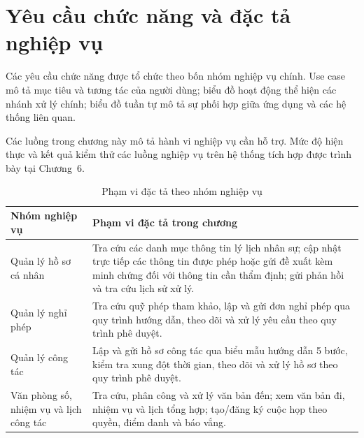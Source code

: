 \section{Yêu cầu chức năng và đặc tả nghiệp vụ}
\label{sec:yeucau_chucnang}
\label{sec:yeucau_chucnang_modules}

Các yêu cầu chức năng được tổ chức theo bốn nhóm nghiệp vụ chính. Use case mô tả mục tiêu và tương tác của người dùng; biểu đồ hoạt động thể hiện các nhánh xử lý chính; biểu đồ tuần tự mô tả sự phối hợp giữa ứng dụng và các hệ thống liên quan.

Các luồng trong chương này mô tả hành vi nghiệp vụ cần hỗ trợ. Mức độ hiện thực và kết quả kiểm thử các luồng nghiệp vụ trên hệ thống tích hợp được trình bày tại Chương~6.

\begin{table}[H]
\centering
\small
\caption{Phạm vi đặc tả theo nhóm nghiệp vụ}
\label{tab:module_owner_scope}
\begin{tabularx}{\textwidth}{|L{4.2cm}|Y|}
\hline
\textbf{Nhóm nghiệp vụ} & \textbf{Phạm vi đặc tả trong chương} \\
\hline
Quản lý hồ sơ cá nhân & Tra cứu các danh mục thông tin lý lịch nhân sự; cập nhật trực tiếp các thông tin được phép hoặc gửi đề xuất kèm minh chứng đối với thông tin cần thẩm định; gửi phản hồi và tra cứu lịch sử xử lý. \\
\hline
Quản lý nghỉ phép & Tra cứu quỹ phép tham khảo, lập và gửi đơn nghỉ phép qua quy trình hướng dẫn, theo dõi và xử lý yêu cầu theo quy trình phê duyệt. \\
\hline
Quản lý công tác & Lập và gửi hồ sơ công tác qua biểu mẫu hướng dẫn 5 bước, kiểm tra xung đột thời gian, theo dõi và xử lý hồ sơ theo quy trình phê duyệt. \\
\hline
Văn phòng số, nhiệm vụ và lịch công tác & Tra cứu, phân công và xử lý văn bản đến; xem văn bản đi, nhiệm vụ và lịch tổng hợp; tạo/đăng ký cuộc họp theo quyền, điểm danh và báo vắng. \\
\hline
\end{tabularx}
\end{table}






